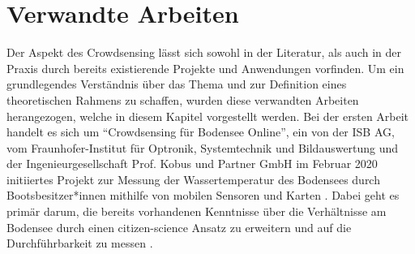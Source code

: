 \section{Verwandte Arbeiten}
Der Aspekt des Crowdsensing lässt sich sowohl in der Literatur, als auch in der Praxis durch bereits existierende Projekte und Anwendungen vorfinden. Um ein grundlegendes Verständnis über das Thema und zur Definition eines theoretischen Rahmens zu schaffen, wurden diese verwandten 
Arbeiten herangezogen, welche in diesem Kapitel vorgestellt werden. \newline Bei der ersten Arbeit handelt es sich um \enquote{Crowdsensing für Bodensee Online}, ein von der ISB AG, vom Fraunhofer-Institut für Optronik, Systemtechnik und Bildauswertung und der Ingenieurgesellschaft Prof. Kobus und Partner GmbH 
im Februar 2020 initiiertes Projekt zur Messung der Wassertemperatur des Bodensees durch Bootsbesitzer*innen mithilfe von mobilen Sensoren und Karten \cite{Ministerium2021}. Dabei geht es primär darum, die bereits vorhandenen Kenntnisse über die Verhältnisse am Bodensee durch einen citizen-science Ansatz zu erweitern und 
auf die Durchführbarkeit zu messen \cite{Bodensee2021}.